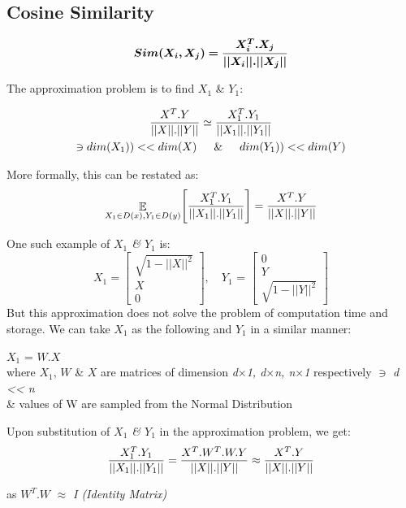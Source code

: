 \documentclass[12pt]{article}
\begin{document}
 \subsection{Cosine Similarity}
\begin{equation}
    \boldsymbol{Sim(X_i,X_j) = \frac{X_i^T.X_j}{||X_i||.||X_j||}} \notag
\end{equation}

\noindent The approximation problem is to find $X_1$ \& $Y_1$:

\begin{gather}
   \frac{X^T.Y}{||X||.||Y||} \simeq \frac{X_1^T.Y_1}{||X_1||.||Y_1||} \notag \\
    \ni dim(X_1)) << dim(X) \indent \& \indent dim(Y_1)) << dim(Y) \notag
\end{gather}

\noindent More formally, this can be restated as:
\begin{equation}
    \mathop{\mathbb{E}}_{X_1\in D(x), Y_1 \in D(y)}\Biggr[\frac{X_1^T.Y_1}{||X_1||.||Y_1||}\Biggr] = \frac{X^T.Y}{||X||.||Y||} \notag
\end{equation}

\noindent One such example of \textit{$X_1$ \& $Y_1$} is: 
\[
    X_1 = \begin{bmatrix}
            \sqrt{1-||X||^2} \\
            X \\
            0
        \end{bmatrix},
    \quad \text{$Y_1$ = }
    \begin{bmatrix}
            0 \\
            Y \\
            \sqrt{1-||Y||^2}
        \end{bmatrix}
\]
But this approximation does not solve the problem of computation time and storage. We can take $X_1$ as the following and $Y_1$ in a similar manner:
\begin{center} 
    $X_1$ = $W.X$ \\
    where $X_1$, $W$ \& $X$ are matrices of dimension \textit{d$\times$1, d$\times$n, n$\times$1} respectively $\ni$ \textit{d << n} \\
    \& values of W are sampled from the Normal Distribution 
\end{center}
Upon substitution of \textit{$X_1$ \& $Y_1$} in the approximation problem, we get: 
\begin{gather}
    \frac{X_1^T.Y_1}{||X_1||.||Y_1||} = \frac{X^T.W^T.W.Y}{||X||.||Y||} \approx \frac{X^T.Y}{||X||.||Y||} \notag 
\end{gather}
\centerline{as $W^T.W$ $\approx$ \textit{I (Identity Matrix)}}
\end{document}
